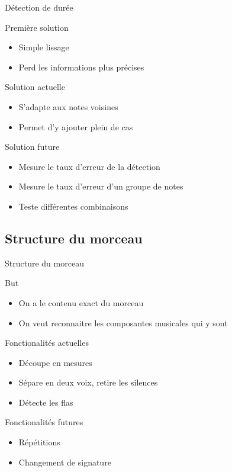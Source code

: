 \documentclass{beamer}
\begin{document}
\begin{frame}{Détection de durée}
    \begin{block}{Première solution}
        \begin{itemize}
            \item Simple lissage
            \item Perd les informations plus précises
        \end{itemize}
    \end{block}
    \begin{block}{Solution actuelle}
        \begin{itemize}
            \item S’adapte aux notes voisines
            \item Permet d’y ajouter plein de cas
        \end{itemize}
    \end{block}
    \begin{block}{Solution future}
        \begin{itemize}
            \item Mesure le taux d’erreur de la détection
            \item Mesure le taux d’erreur d’un groupe de notes
            \item Teste différentes combinaisons
        \end{itemize}
    \end{block}
\end{frame}

\subsection{Structure du morceau}

\begin{frame}{Structure du morceau}
    \begin{block}{But}
        \begin{itemize}
            \item On a le contenu exact du morceau
            \item On veut reconnaitre les composantes musicales qui y sont
        \end{itemize}
    \end{block}
    \begin{block}{Fonctionalités actuelles}
        \begin{itemize}
            \item Découpe en mesures
            \item Sépare en deux voix, retire les silences
            \item Détecte les flas
        \end{itemize}
    \end{block}
    \begin{block}{Fonctionalités futures}
        \begin{itemize}
            \item Répétitions
            \item Changement de signature
        \end{itemize}
    \end{block}
\end{frame}
\end{document}
